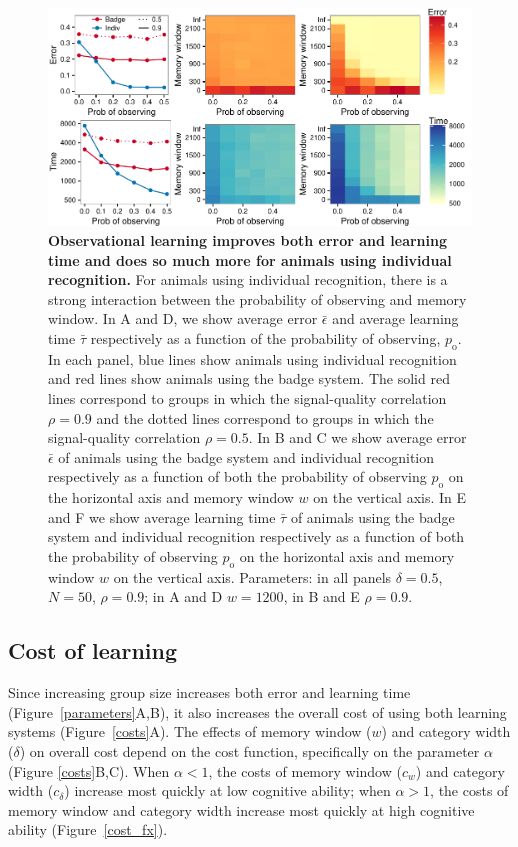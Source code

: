 \begin{figure}
\includegraphics[width=6.85in]{figures/observational_learning.pdf}
\caption{\sffamily\small\textbf{Observational learning improves both error and learning time and does so much more for animals using individual recognition.} For animals using individual recognition, there is a strong interaction between the probability of observing and memory window. In A and D, we show average error $\bar{\epsilon}$ and average learning time $\bar{\tau}$ respectively as a function of the probability of observing, $p_\text{o}$. In each panel, blue lines show animals using individual recognition and red lines show animals using the badge system. The solid red lines correspond to groups in which the signal-quality correlation $\rho=0.9$ and the dotted lines correspond to groups in which the signal-quality correlation $\rho=0.5$. In B and C we show average error $\bar{\epsilon}$ of animals using the badge system and individual recognition respectively as a function of both the probability of observing $p_\text{o}$ on the horizontal axis and memory window $w$ on the vertical axis. In E and F we show average learning time $\bar{\tau}$ of animals using the badge system and individual recognition respectively as a function of both the probability of observing $p_\text{o}$ on the horizontal axis and memory window $w$ on the vertical axis.  Parameters: in all panels $\delta = 0.5$, $N=50$, $\rho=0.9$; in A and D $w=1200$, in B and E $\rho=0.9$.}
\label{observational}
\end{figure}

%
\subsection*{Cost of learning}
% 
Since increasing group size increases both error and learning time (Figure~\ref{parameters}A,B), it also increases the overall cost of using both learning systems (Figure~\ref{costs}A). The effects of memory window ($w$) and category width ($\delta$) on overall cost depend on the cost function, specifically on the parameter $\alpha$ (Figure \ref{costs}B,C). When $\alpha<1$, the costs of memory window ($c_w$) and category width ($c_\delta$) increase most quickly at low cognitive ability; when $\alpha>1$, the costs of memory window and category width increase most quickly at high cognitive ability (Figure~\ref{cost_fx}). 

